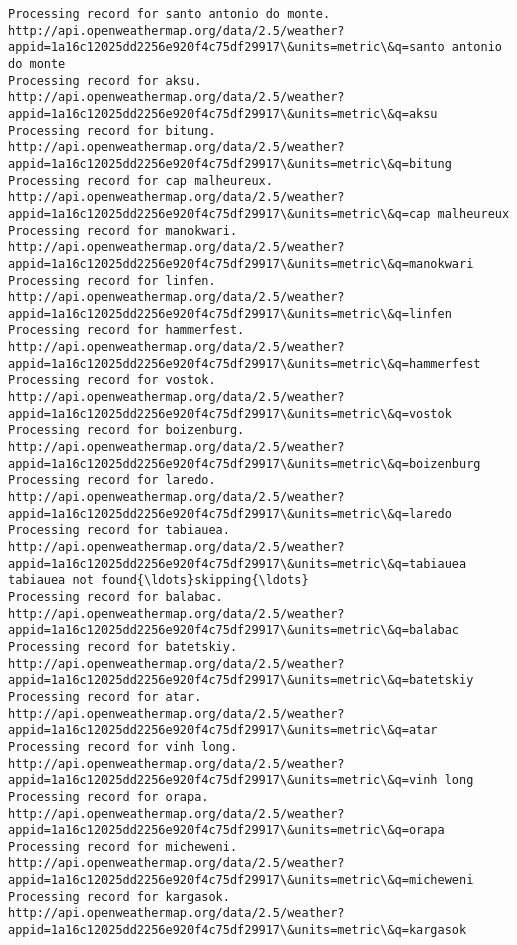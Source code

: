 \documentclass[11pt]{article}
\begin{document}
\begin{Verbatim}[commandchars=\\\{\}]
Processing record for santo antonio do monte.
http://api.openweathermap.org/data/2.5/weather?appid=1a16c12025dd2256e920f4c75df29917\&units=metric\&q=santo antonio do monte
Processing record for aksu.
http://api.openweathermap.org/data/2.5/weather?appid=1a16c12025dd2256e920f4c75df29917\&units=metric\&q=aksu
Processing record for bitung.
http://api.openweathermap.org/data/2.5/weather?appid=1a16c12025dd2256e920f4c75df29917\&units=metric\&q=bitung
Processing record for cap malheureux.
http://api.openweathermap.org/data/2.5/weather?appid=1a16c12025dd2256e920f4c75df29917\&units=metric\&q=cap malheureux
Processing record for manokwari.
http://api.openweathermap.org/data/2.5/weather?appid=1a16c12025dd2256e920f4c75df29917\&units=metric\&q=manokwari
Processing record for linfen.
http://api.openweathermap.org/data/2.5/weather?appid=1a16c12025dd2256e920f4c75df29917\&units=metric\&q=linfen
Processing record for hammerfest.
http://api.openweathermap.org/data/2.5/weather?appid=1a16c12025dd2256e920f4c75df29917\&units=metric\&q=hammerfest
Processing record for vostok.
http://api.openweathermap.org/data/2.5/weather?appid=1a16c12025dd2256e920f4c75df29917\&units=metric\&q=vostok
Processing record for boizenburg.
http://api.openweathermap.org/data/2.5/weather?appid=1a16c12025dd2256e920f4c75df29917\&units=metric\&q=boizenburg
Processing record for laredo.
http://api.openweathermap.org/data/2.5/weather?appid=1a16c12025dd2256e920f4c75df29917\&units=metric\&q=laredo
Processing record for tabiauea.
http://api.openweathermap.org/data/2.5/weather?appid=1a16c12025dd2256e920f4c75df29917\&units=metric\&q=tabiauea
tabiauea not found{\ldots}skipping{\ldots}
Processing record for balabac.
http://api.openweathermap.org/data/2.5/weather?appid=1a16c12025dd2256e920f4c75df29917\&units=metric\&q=balabac
Processing record for batetskiy.
http://api.openweathermap.org/data/2.5/weather?appid=1a16c12025dd2256e920f4c75df29917\&units=metric\&q=batetskiy
Processing record for atar.
http://api.openweathermap.org/data/2.5/weather?appid=1a16c12025dd2256e920f4c75df29917\&units=metric\&q=atar
Processing record for vinh long.
http://api.openweathermap.org/data/2.5/weather?appid=1a16c12025dd2256e920f4c75df29917\&units=metric\&q=vinh long
Processing record for orapa.
http://api.openweathermap.org/data/2.5/weather?appid=1a16c12025dd2256e920f4c75df29917\&units=metric\&q=orapa
Processing record for micheweni.
http://api.openweathermap.org/data/2.5/weather?appid=1a16c12025dd2256e920f4c75df29917\&units=metric\&q=micheweni
Processing record for kargasok.
http://api.openweathermap.org/data/2.5/weather?appid=1a16c12025dd2256e920f4c75df29917\&units=metric\&q=kargasok

\end{Verbatim}
\end{document}
